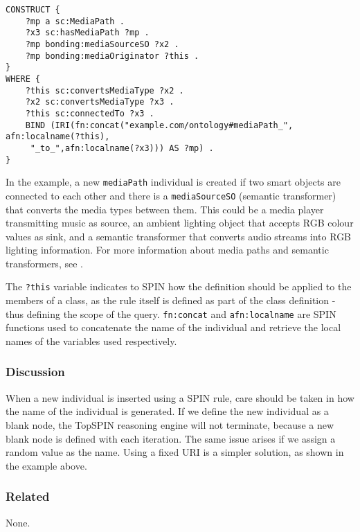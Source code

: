 \begin{verbatim} 
CONSTRUCT {
    ?mp a sc:MediaPath .
    ?x3 sc:hasMediaPath ?mp .
    ?mp bonding:mediaSourceSO ?x2 .
    ?mp bonding:mediaOriginator ?this .
}
WHERE {
    ?this sc:convertsMediaType ?x2 .
    ?x2 sc:convertsMediaType ?x3 .
    ?this sc:connectedTo ?x3 .
    BIND (IRI(fn:concat("example.com/ontology#mediaPath_", afn:localname(?this),
     "_to_",afn:localname(?x3))) AS ?mp) .
}
\end{verbatim}

In the example, a new \texttt{mediaPath} individual is created if two smart objects are connected to each other and there is a \texttt{mediaSourceSO} (semantic transformer) that converts the media types between them. This could be a media player transmitting music as source, an ambient lighting object that accepts RGB colour values as sink, and a semantic transformer that converts audio streams into RGB lighting information. For more information about media paths and semantic transformers, see \cite{Niezen2011}.

The \texttt{?this} variable indicates to \ac{SPIN} how the definition should be applied to the members of a class, as the rule itself is defined as part of the class definition - thus defining the scope of the query. \texttt{fn:concat} and \texttt{afn:localname} are \ac{SPIN} functions used to concatenate the name of the individual and retrieve the local names of the variables used respectively.

\subsubsection{Discussion}

When a new individual is inserted using a \ac{SPIN} rule, care should be taken in how the name of the individual is generated. If we define the new individual as a blank node, the TopSPIN reasoning engine will not terminate, because a new blank node is defined with each iteration. The same issue arises if we assign a random value as the name. Using a fixed URI is a simpler solution, as shown in the example above.

\subsubsection{Related}

None.





